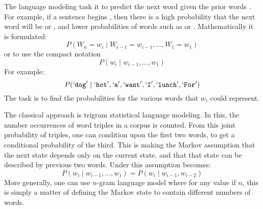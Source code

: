 \documentclass[parskip]{komatufte}
\begin{document}

The language modeling task it to predict the next word given the prior words .
For example, if a sentence begins , then there is a high probability that the next word will be  or ,
and lower probabilities of words such as  or .
Mathematically it is formulated: 
\begin{equation}\label{equ:langmodel}
	P(W_n{=}w_i \mid W_{i-1}{=}w_{i-1}, \ldots, W_1{=}w_1)
\end{equation}
or to use the compact notation 
\begin{equation}\label{equ:langmodelcompact}
P(w_i \mid w_{i-1}, \ldots, w_1)
\end{equation}
For example: 
\begin{equation*}
P(`\texttt{dog}' \mid `\texttt{hot}', `\texttt{a}', `\texttt{want}', `\texttt{I}', `\texttt{lunch}', `\texttt{For}')
\end{equation*}
The task is to find the probabilities for the various words that $w_i$ could represent.


  
The classical approach is trigram statistical language modeling.
In this, the number occurrences of word triples in a corpus is counted.
From this joint probability of triples, one can condition upon the first two words,
to get a conditional probability of the third.
This is making the Markov assumption that the next state depends only on the current state,
and that that state can be described by previous two words.
Under this assumption  becomes:
\begin{equation}\label{equ:trigramlangmodel}
P(w_i \mid w_{i-1}, \ldots, w_1) = P(w_i \mid w_{i-1}, w_{i-2})
\end{equation}
More generally, one can use $n$-gram language model where for any value if $n$,
this is simply a matter of defining the Markov state to contain different numbers of words.
\end{document}
